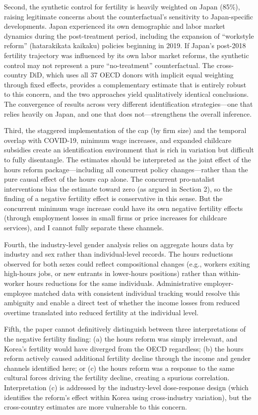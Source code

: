 \documentclass[12pt]{article}
\begin{document}
Second, the synthetic control for fertility is heavily weighted on Japan (85\%), raising legitimate concerns about the counterfactual's sensitivity to Japan-specific developments. Japan experienced its own demographic and labor market dynamics during the post-treatment period, including the expansion of ``workstyle reform'' (hatarakikata kaikaku) policies beginning in 2019. If Japan's post-2018 fertility trajectory was influenced by its own labor market reforms, the synthetic control may not represent a pure ``no-treatment'' counterfactual. The cross-country DiD, which uses all 37 OECD donors with implicit equal weighting through fixed effects, provides a complementary estimate that is entirely robust to this concern, and the two approaches yield qualitatively identical conclusions. The convergence of results across very different identification strategies---one that relies heavily on Japan, and one that does not---strengthens the overall inference.

Third, the staggered implementation of the cap (by firm size) and the temporal overlap with COVID-19, minimum wage increases, and expanded childcare subsidies create an identification environment that is rich in variation but difficult to fully disentangle. The estimates should be interpreted as the joint effect of the hours reform package---including all concurrent policy changes---rather than the pure causal effect of the hours cap alone. The concurrent pro-natalist interventions bias the estimate toward zero (as argued in Section 2), so the finding of a negative fertility effect is conservative in this sense. But the concurrent minimum wage increase could have its own negative fertility effects (through employment losses in small firms or price increases for childcare services), and I cannot fully separate these channels.

Fourth, the industry-level gender analysis relies on aggregate hours data by industry and sex rather than individual-level records. The hours reductions observed for both sexes could reflect compositional changes (e.g., workers exiting high-hours jobs, or new entrants in lower-hours positions) rather than within-worker hours reductions for the same individuals. Administrative employer-employee matched data with consistent individual tracking would resolve this ambiguity and enable a direct test of whether the income losses from reduced overtime translated into reduced fertility at the individual level.

Fifth, the paper cannot definitively distinguish between three interpretations of the negative fertility finding: (a) the hours reform was simply irrelevant, and Korea's fertility would have diverged from the OECD regardless; (b) the hours reform actively caused additional fertility decline through the income and gender channels identified here; or (c) the hours reform was a response to the same cultural forces driving the fertility decline, creating a spurious correlation. Interpretation (c) is addressed by the industry-level dose-response design (which identifies the reform's effect within Korea using cross-industry variation), but the cross-country estimates are more vulnerable to this concern.
\end{document}
